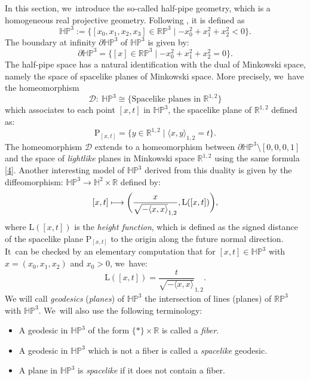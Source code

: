\documentclass[JEP,XML,SOM,Unicode,NoEqCountersInSection, NoFloatCountersInSection,published]{cedram}
\newcommand\mto{\mathchoice{\longmapsto}{\mapsto}{\mapsto}{\mapsto}}
\theoremstyle{plain}
\theoremstyle{definition}
\newcommand{\minko}{\mathbb{R}^{1,2}}
\newcommand{\HP}{\mathbb{HP}^3}
\begin{document}
In this section, we~introduce the so-called half-pipe geometry, which is a homogeneous real projective geometry. Following
\cite{danciger_thesis}, it is defined as
\[
\HP :=\{[x_0,x_1,x_2,x_3]\in\mathbb{RP}^3\mid -x_0^2+x_1^2+x_2^2<0\}.
\]
The boundary at infinity $\partial\HP$ of $\HP$ is given by:
\[
\partial\HP=\{[x]\in \mathbb{RP}^3\mid -x_0^2+x_1^2+x_2^2=0\}.
\]The half-pipe space has a natural identification with the dual of Minkowski space, namely the space of spacelike planes of Minkowski space. More precisely, we~have the homeomorphism
\begin{equation}\label{hpminko}
\mathcal{D}:\ \HP\cong \{\text{Spacelike planes in } \minko\}
\end{equation}
which associates to each point $[x,t]$ in $\HP$, the spacelike plane of $\minko$ defined as:
\begin{equation}\label{4}
\mathrm{P}_{[x,t]}=\{ y \in \minko \mid \langle x,y \rangle_{1,2} = t \}.
\end{equation}
The homeomorphism $\mathcal{D}$ extends to a homeomorphism between $\partial\HP\setminus[0,0,0,1]$ and the space of \emph{lightlike} planes in Minkowski space $\minko$ using the same formula \eqref{4}. Another interesting model of $\HP$ derived from this duality is given by the diffeomorphism: $\HP\to\mathbb{H}^2\times\mathbb{R}$ defined by:
\begin{equation}\label{L}
[x,t]\mto\biggl(\frac{x}{\sqrt{-\langle x,x\rangle}_{1,2}},\mathrm{L}([x,t])\biggr),
\end{equation}
where $\mathrm{L}([x,t])$ is the \emph{height function}, which is defined as the signed distance of the spacelike plane $\mathrm{P}_{[x,t]}$ to the origin along the future normal direction. It~can be checked by an elementary computation that for \([x,t] \in \HP\) with \(x = (x_0, x_1, x_2)\) and \(x_0 > 0\), we~have: \begin{equation}\label{formule_L}
\mathrm{L}([x,t])=\frac{t}{\sqrt{-\langle x,x\rangle}}_{1,2}.
\end{equation}
We will call \emph{geodesics} (\resp \emph{planes}) of $\HP$ the intersection of lines (\resp planes) of $\mathbb{RP}^3$ with $\HP$. We~will also use the following terminology:
\begin{itemize}
\item A geodesic in $\HP$ of the form $\{*\}\times \mathbb{R}$ is called a \emph{fiber}.
\item A geodesic in $\HP$ which is not a fiber is called a \emph{spacelike} geodesic.
\item A plane in $\HP$ is \emph{spacelike} if it does not contain a fiber.
\end{itemize}
\end{document}
